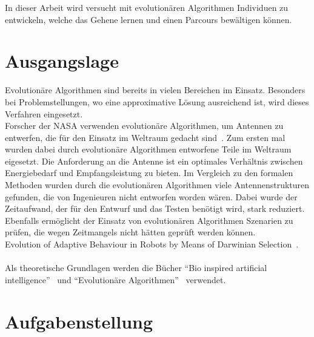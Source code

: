   In dieser Arbeit wird versucht mit evolutionären Algorithmen Individuen zu entwickeln,
  welche das Gehene lernen und einen Parcours bewältigen können.

  \section{Ausgangslage}



    Evolutionäre Algorithmen sind bereits in vielen Bereichen im Einsatz.
    Besonders bei Problemstellungen, wo eine approximative Lösung ausreichend ist,
    wird dieses Verfahren eingesetzt.
    \\
    Forscher der NASA verwenden evolutionäre Algorithmen, um Antennen zu entwerfen,
    die für den Einsatz im Weltraum gedacht sind~\cite{Hornby2006}.
    Zum ersten mal wurden dabei durch evolutionäre Algorithmen entworfene Teile im Weltraum eigesetzt.
    Die Anforderung an die Antenne ist ein optimales Verhältnis zwischen Energiebedarf und Empfangsleistung zu bieten.
    Im Vergleich zu den formalen Methoden wurden durch die evolutionären Algorithmen viele Antennenstrukturen gefunden,
    die von Ingenieuren nicht entworfen worden wären.
    Dabei wurde der Zeitaufwand, der für den Entwurf und das Testen benötigt wird, stark reduziert.
    Ebenfalls ermöglicht der Einsatz von evolutionären Algorithmen Szenarien zu prüfen,
    die wegen Zeitmangels nicht hätten geprüft werden können.
    \\
    Evolution of Adaptive Behaviour in Robots by Means of Darwinian Selection~\cite{Floreano2010}.
    \\
    \\
    Als theoretische Grundlagen werden die Bücher ``Bio inspired artificial intelligence''~\cite{book:bioInspired} und
    ``Evolutionäre Algorithmen''~\cite{book:evAlgo} verwendet.


  \section{Aufgabenstellung}

